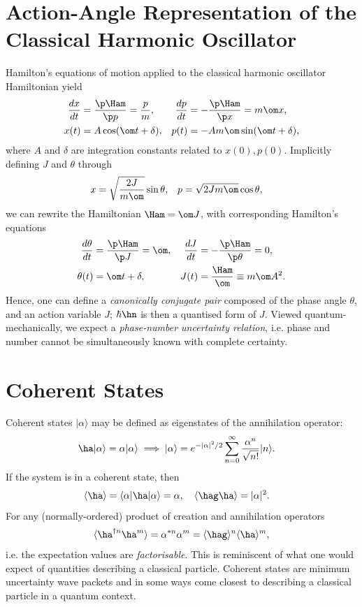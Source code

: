 \documentclass[a4paper, 11pt, normalem]{report}
\begin{document}
\section{Action-Angle Representation of the Classical Harmonic Oscillator}
Hamilton's equations of motion applied to the classical harmonic oscillator Hamiltonian yield
\begin{align}
    \frac{dx}{dt} &= \frac{\p \Ham}{\p p} = \frac{p}{m}, & \frac{dp}{dt} &= -\frac{\p\Ham}{\p x}=m\om x,\\
    x(t) &= A\cos(\om t+\delta), & p(t) &= -Am\om\sin(\om t+\delta),
\end{align}
where $A$ and $\delta$ are integration constants related to $x(0),p(0)$.
Implicitly defining $J$ and $\theta$ through
\begin{align}
    x &= \sqrt{\frac{2J}{m\om}}\sin\theta, & p &= \sqrt{2Jm\om}\cos\theta,
\end{align}
we can rewrite the Hamiltonian $\Ham =\om J$, with corresponding Hamilton's equations
\begin{align}
    \frac{d\theta}{dt} &= \frac{\p\Ham}{\p J} = \om, & \frac{dJ}{dt} &= -\frac{\p\Ham}{\p\theta} = 0,\\
    \theta(t) &= \om t+\delta, & J(t) &= \frac{\Ham}{\om}\equiv m\om A^2.
\end{align}
Hence, one can define a \emph{canonically conjugate pair} composed of the phase angle $\theta$, and an action variable $J$; $\hbar\hn$ is then a quantised form of $J$.
Viewed quantum-mechanically, we expect a \emph{phase-number uncertainty relation}, i.e. phase and number cannot be simultaneously known with complete certainty.

\section{Coherent States}
Coherent states $|\alpha\rangle$ may be defined as eigenstates of the annihilation operator:
\begin{align}
    \ha|\alpha\rangle &= \alpha|\alpha\rangle \implies |\alpha\rangle = e^{-|\alpha|^2/2}\sum_{n=0}^\infty \frac{\alpha^n}{\sqrt{n!}}|n\rangle.
\end{align}
If the system is in a coherent state, then
\begin{align}
    \langle\ha\rangle &= \langle\alpha|\ha|\alpha\rangle = \alpha,\quad \langle\hag\ha\rangle = |\alpha|^2.
\end{align}
For any (normally-ordered) product of creation and annihilation operators
\begin{align}
    \langle\ha^{\dagger n}\ha^m\rangle = \alpha^{*n}\alpha^m = \langle\hag\rangle^n\langle\ha\rangle^m,
\end{align}
i.e. the expectation values are \emph{factorisable}.
This is reminiscent of what one would expect of quantities describing a classical particle.
Coherent states are minimum uncertainty wave packets and in some ways come closest to describing a classical particle in a quantum context.
\end{document}

